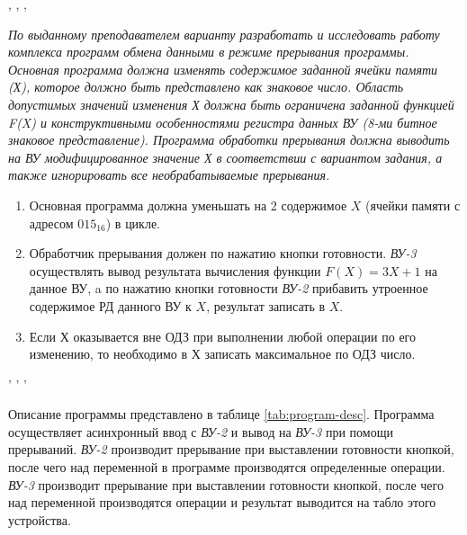 \tableofcontents


\newpage
\Chapter{\lab\ \labnumber}{\labtheme}{}

\begin{center}
, , ,
\end{center}
\noindent





\textit{По выданному преподавателем варианту разработать и исследовать работу комплекса программ обмена данными в режиме прерывания программы. Основная программа должна изменять содержимое заданной ячейки памяти (Х), которое должно быть представлено как знаковое число. Область допустимых значений изменения Х должна быть ограничена заданной функцией F(X) и конструктивными особенностями регистра данных ВУ (8-ми битное знаковое представление). Программа обработки прерывания должна выводить на ВУ модифицированное значение Х в соответствии с вариантом задания, а также игнорировать все необрабатываемые прерывания.}
\begin{enumerate}
    \item Основная программа должна уменьшать на 2 содержимое $X$ (ячейки памяти с адресом $015_{16}$) в цикле.
    \item Обработчик прерывания должен по нажатию кнопки готовности. \textit{ВУ-3} осуществлять вывод результата вычисления функции $F(X)=3X+1$ на данное ВУ, a по нажатию кнопки готовности \textit{ВУ-2} прибавить утроенное содержимое РД данного ВУ к $X$, результат записать в $X$.
    \item Если $Х$ оказывается вне ОДЗ при выполнении любой операции по его изменению, то необходимо в $Х$ записать максимальное по ОДЗ число.
\end{enumerate}
\begin{center}
    ' ' '
\end{center}

\newpage
{}


Описание программы представлено в таблице \ref{tab:program-desc}.
Программа осуществляет асинхронный ввод с \textit{ВУ-2} и вывод на \textit{ВУ-3} при помощи прерываний. \textit{ВУ-2} производит прерывание при выставлении готовности кнопкой, после чего над переменной в программе производятся определенные операции. \textit{ВУ-3} производит прерывание при выставлении готовности кнопкой, после чего над переменной производятся операции и результат выводится на табло этого устройства.


